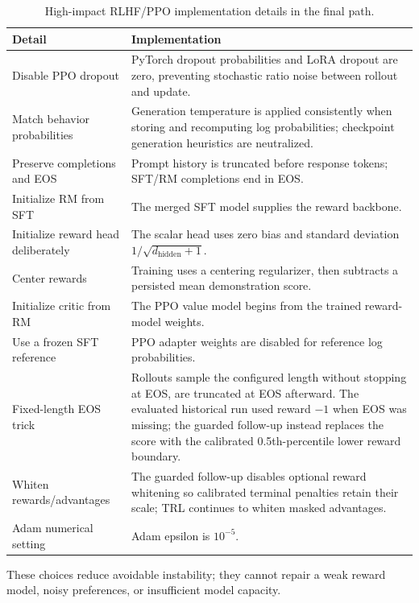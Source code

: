 \documentclass[11pt]{article}
\newcommand{\trl}{\textsc{TRL}}
\begin{document}
\begin{table}[H]
\centering
\small
\caption{High-impact RLHF/PPO implementation details in the final path.}
\label{tab:nplus}
\begin{tabularx}{\textwidth}{@{}p{}Y@{}}
\toprule
\textbf{Detail} & \textbf{Implementation}\\
\midrule
Disable PPO dropout &
PyTorch dropout probabilities and LoRA dropout are zero, preventing stochastic
ratio noise between rollout and update.\\
Match behavior probabilities &
Generation temperature is applied consistently when storing and recomputing
log probabilities; checkpoint generation heuristics are neutralized.\\
Preserve completions and EOS &
Prompt history is truncated before response tokens; SFT/RM completions end in
EOS.\\
Initialize RM from SFT &
The merged SFT model supplies the reward backbone.\\
Initialize reward head deliberately &
The scalar head uses zero bias and standard deviation
$1/\sqrt{d_{\mathrm{hidden}}+1}$.\\
Center rewards &
Training uses a centering regularizer, then subtracts a persisted mean
demonstration score.\\
Initialize critic from RM &
The PPO value model begins from the trained reward-model weights.\\
Use a frozen SFT reference &
PPO adapter weights are disabled for reference log probabilities.\\
Fixed-length EOS trick &
Rollouts sample the configured length without stopping at EOS, are truncated
at EOS afterward. The evaluated historical run used reward $-1$ when EOS was
missing; the guarded follow-up instead replaces the score with the calibrated
0.5th-percentile lower reward boundary.\\
Whiten rewards/advantages &
The guarded follow-up disables optional reward whitening so calibrated terminal
penalties retain their scale; \trl{} continues to whiten masked advantages.\\
Adam numerical setting &
Adam epsilon is $10^{-5}$.\\
\bottomrule
\end{tabularx}
\end{table}

These choices reduce avoidable instability; they cannot repair a weak reward
model, noisy preferences, or insufficient model capacity.
\end{document}
